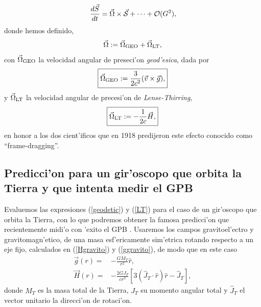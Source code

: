 \begin{equation}
\frac{d\vec{S}}{dt}=\vec{\Omega}\times\vec{{\cal S}}+\cdots + \mathcal{O}(G^2),
\end{equation}
donde hemos definido,
\begin{equation}
\vec{\Omega}:=\vec{\Omega}_{\rm GEO}+\vec{\Omega}_{\rm LT},
\end{equation}
con $\vec{\Omega}_{\rm GEO}$ la velocidad angular de preseci'on \emph{geod'esica}, dada por
\begin{align}\boxed{
\vec{\Omega}_{\rm GEO}:=\frac{3}{2c^2}(\vec{v}\times\vec{g}),}\label{geodetic}
\end{align}
y $\vec{\Omega}_{\rm LT}$ la velocidad angular de precesi'on de \emph{Lense-Thirring}, 
\begin{align}\boxed{
\vec{\Omega}_{\rm LT}:=-\frac{1}{2c}\vec{H},}\label{LT}
\end{align}
en honor a los dos cient'ificos que en 1918 predijeron este efecto conocido como ``frame-dragging''.


\subsection{Predicci'on para un gir'oscopo que orbita la Tierra y que intenta medir el GPB}

Evaluemos las expresiones (\ref{geodetic}) y (\ref{LT}) para el caso de un gir'oscopo que orbita la Tierra, con lo que podremos obtener la famosa predicci'on que recientemente midi'o con 'exito el GPB \cite{Everitt11}. Usaremos los campos gravitoel'ectro y gravitomagn'etico, de una masa esf'ericamente sim'etrica rotando respecto a un eje fijo, calculados en (\ref{Hgravito}) y (\ref{ggravito}), de modo que en este caso
\begin{align}
\vec{g}(r)={}&-\frac{GM_T}{r^2}\hat{r},\label{gGPB}\\
\vec{H}(r)={}&-\frac{2GJ_T}{cr^3}\left[3(\hat{J}_T\cdot\hat{r})\hat{r}-\hat{J}_T\right]\label{BGPB},
\end{align}
donde $M_T$ es la masa total de la Tierra, $J_T$ su momento angular total y $\hat{J}_T$ el vector unitario la direcci'on de rotaci'on.

